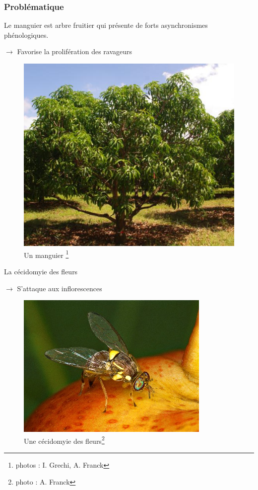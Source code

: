 \documentclass[xcolor={dvipsnames}]{beamer}
\begin{document}
\begin{frame}
 \frametitle{Problématique}
 
 
 
 \begin{multicols}{2}
 Le manguier est arbre fruitier qui présente de forts asynchronismes phénologiques.

 \vspace{0.2cm}
 
 $\rightarrow$ Favorise la prolifération des ravageurs

 \begin{figure}
 \includegraphics[scale = 0.37]{manguier.jpg}
{\scriptsize \caption{Un manguier \footnote{photos : I. Grechi, A. Franck}}}
 \end{figure}
\end{multicols}

\pause

 \begin{multicols}{2}
 La cécidomyie des fleurs

 \vspace{0.2cm}
 
 $\rightarrow$ S'attaque aux inflorescences

 \begin{figure}
 \includegraphics[scale = 0.8]{cecido.jpg}
\caption{Une cécidomyie des fleurs\footnote{photo : A. Franck}}
 \end{figure}


\end{multicols}
\end{frame}
\end{document}
